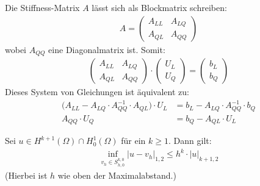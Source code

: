 Die Stiffness-Matrix $A$ lässt sich als Blockmatrix schreiben:
\begin{align*}
	A=\begin{pmatrix}
		A_{LL} & A_{LQ}\\
		A_{QL} & A_{QQ}
	\end{pmatrix}
\end{align*}
wobei $A_{QQ}$ eine Diagonalmatrix ist. Somit:
\begin{align*}
	\begin{pmatrix}
		A_{LL} & A_{LQ}\\
		A_{QL} & A_{QQ}
	\end{pmatrix}\cdot\begin{pmatrix}
		U_L\\ U_Q
	\end{pmatrix}=
	\begin{pmatrix}
		b_L\\ b_Q
	\end{pmatrix}
\end{align*}
Dieses System von Gleichungen ist äquivalent zu:
\begin{align*}
	\big(A_{LL}-A_{LQ}\cdot A^{-1}_{QQ}\cdot A_{QL}\big)\cdot U_L&= b_L-A_{LQ}\cdot A^{-1}_{QQ}\cdot b_Q\\
	A_{QQ}\cdot U_Q&= b_Q-A_{QL}\cdot U_L
\end{align*}

\begin{theorem}\label{theorem4.2}\enter
	Sei $u\in H^{k+1}(\Omega)\cap H^{1}_0(\Omega)$ für ein $k\geq1$. Dann gilt:
	\begin{align*}
		\inf\limits_{v_h\in S_{h,0}^{k,0}}\big|u-v_h\big|_{1,2}\leq h^k\cdot|u|_{k+1,2}
	\end{align*}
	(Hierbei ist $h$ wie oben der Maximalabstand.)
\end{theorem}

